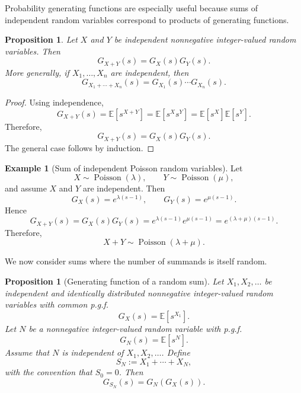 \documentclass[11pt]{article}
\theoremstyle{plain}
\newtheorem{proposition}[theorem]{Proposition}
\theoremstyle{definition}
\newtheorem{example}[theorem]{Example}
\theoremstyle{remark}
\begin{document}
	Probability generating functions are especially useful because sums of independent random variables correspond to products of generating functions.
	
	\begin{proposition}
		Let \(X\) and \(Y\) be independent nonnegative integer-valued random variables. Then
		\[
		G_{X+Y}(s)
		=
		G_X(s)G_Y(s).
		\]
		More generally, if \(X_1,\dots,X_n\) are independent, then
		\[
		G_{X_1+\cdots+X_n}(s)
		=
		G_{X_1}(s)\cdots G_{X_n}(s).
		\]
	\end{proposition}
	
	\begin{proof}
		Using independence,
		\[
		G_{X+Y}(s)
		=
		\mathbb{E}[s^{X+Y}]
		=
		\mathbb{E}[s^Xs^Y]
		=
		\mathbb{E}[s^X]\mathbb{E}[s^Y].
		\]
		Therefore,
		\[
		G_{X+Y}(s)=G_X(s)G_Y(s).
		\]
		The general case follows by induction.
	\end{proof}
	
	\begin{example}[Sum of independent Poisson random variables]
		Let
		\[
		X\sim\operatorname{Poisson}(\lambda),
		\qquad
		Y\sim\operatorname{Poisson}(\mu),
		\]
		and assume \(X\) and \(Y\) are independent. Then
		\[
		G_X(s)=e^{\lambda(s-1)},
		\qquad
		G_Y(s)=e^{\mu(s-1)}.
		\]
		Hence
		\[
		G_{X+Y}(s)
		=
		G_X(s)G_Y(s)
		=
		e^{\lambda(s-1)}e^{\mu(s-1)}
		=
		e^{(\lambda+\mu)(s-1)}.
		\]
		Therefore,
		\[
		X+Y\sim\operatorname{Poisson}(\lambda+\mu).
		\]
	\end{example}
	
	
	We now consider sums where the number of summands is itself random.
	
	\begin{proposition}[Generating function of a random sum]
		Let \(X_1,X_2,\dots\) be independent and identically distributed nonnegative integer-valued random variables with common p.g.f.
		\[
		G_X(s)=\mathbb{E}[s^{X_1}].
		\]
		Let \(N\) be a nonnegative integer-valued random variable with p.g.f.
		\[
		G_N(s)=\mathbb{E}[s^N].
		\]
		Assume that \(N\) is independent of \(X_1,X_2,\dots\). Define
		\[
		S_N:=X_1+\cdots+X_N,
		\]
		with the convention that \(S_0=0\). Then
		\[
		G_{S_N}(s)
		=
		G_N(G_X(s)).
		\]
	\end{proposition}
	
\end{document}
